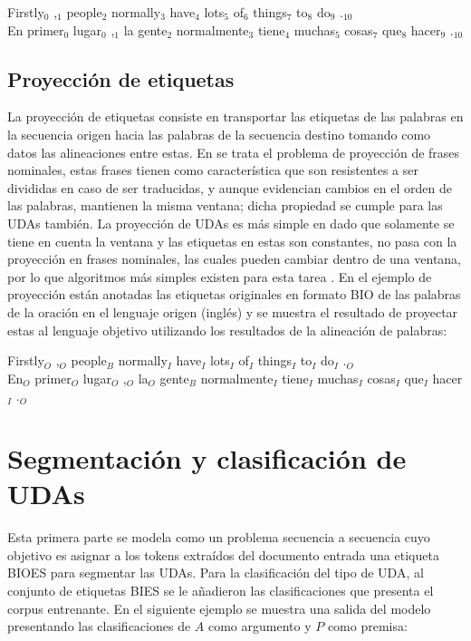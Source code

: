 \documentclass[a4paper,11pt,twocolumn,twoside]{article}
\begin{document}
\begin{adjustwidth}{25pt}{25pt}
	Firstly$_0$ ,$_1$ people$_2$ normally$_3$ have$_4$ lots$_5$ of$_6$ things$_7$ to$_8$ do$_9$ .$_{10}$ \\
	En primer$_0$ lugar$_0$ ,$_1$ la gente$_2$ normalmente$_3$ tiene$_4$ muchas$_5$ cosas$_7$ que$_8$ hacer$_9$ .$_{10}$
\end{adjustwidth}

\subsection{Proyección de etiquetas}

La proyección de etiquetas consiste en transportar las etiquetas de las palabras en la secuencia origen
hacia las palabras de la secuencia destino tomando como datos las alineaciones entre estas. En \cite{yarowsky2001inducing}
se trata el problema de proyección de frases nominales, estas frases tienen como característica que son resistentes
a ser divididas en caso de ser traducidas, y aunque evidencian 
cambios en el orden de las palabras, mantienen la misma ventana; dicha propiedad se cumple para las UDAs también.
La proyección de UDAs es más simple en dado
que solamente se tiene en cuenta la ventana y las etiquetas en estas son constantes, no pasa con la proyección en
frases nominales, las cuales pueden cambiar dentro de una ventana, por lo que algoritmos más simples existen
para esta tarea \cite{eger2018cross}. En el ejemplo de proyección están anotadas las etiquetas originales en formato BIO
de las palabras de la oración en el lenguaje origen (inglés) y se muestra el
resultado de proyectar estas al lenguaje objetivo utilizando los resultados de la alineación de palabras:

\begin{adjustwidth}{25pt}{25pt}
	Firstly$_O$ ,$_O$ people$_B$ normally$_I$ have$_I$ lots$_I$ of$_I$ things$_I$ to$_I$ do$_I$ .$_O$ \\
	En$_O$ primer$_O$ lugar$_O$ ,$_O$ la$_O$ gente$_B$ normalmente$_I$ tiene$_I$ muchas$_I$ cosas$_I$ que$_I$ hacer$_I$ .$_O$
\end{adjustwidth}

\section{Segmentación y clasificación de UDAs}

Esta primera parte se modela como un problema secuencia a secuencia cuyo objetivo es asignar a los tokens 
extraídos del documento entrada una etiqueta BIOES para segmentar las UDAs. Para la clasificación del tipo 
de UDA, al conjunto de etiquetas BIES se le añadieron las clasificaciones que presenta el corpus entrenante.
En el siguiente ejemplo se muestra una salida del modelo presentando las clasificaciones de
$A$ como argumento y $P$ como premisa:
\end{document}
